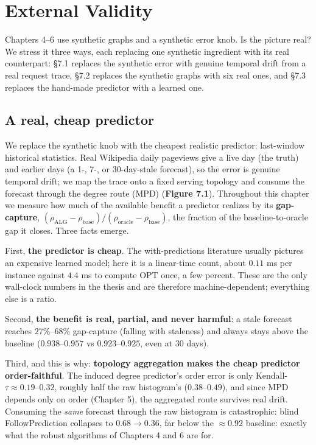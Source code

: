\chapter{External Validity}

Chapters 4--6 use synthetic graphs and a synthetic error knob. Is the
picture real? We stress it three ways, each replacing one synthetic
ingredient with its real counterpart: §7.1 replaces the synthetic error
with genuine temporal drift from a real request trace, §7.2 replaces the
synthetic graphs with six real ones, and §7.3 replaces the hand-made
predictor with a learned one.

\section{A real, cheap predictor}

We replace the synthetic knob with the cheapest realistic predictor:
last-window historical statistics. Real Wikipedia daily pageviews give a
live day (the truth) and earlier days (a 1-, 7-, or 30-day-stale
forecast), so the error is genuine temporal drift; we map the trace onto
a fixed serving topology and consume the forecast through the degree
route (MPD) (\textbf{Figure 7.1}). Throughout this chapter we measure
how much of the available benefit a predictor realizes by its
\textbf{gap-capture},
\((\rho_{\mathrm{ALG}}-\rho_{\mathrm{base}})/(\rho_{\mathrm{oracle}}-\rho_{\mathrm{base}})\),
the fraction of the baseline-to-oracle gap it closes. Three facts
emerge.

First, \textbf{the predictor is cheap}. The with-predictions literature
usually pictures an expensive learned model; here it is a linear-time
count, about \(0.11\) ms per instance against \(4.4\) ms to compute
\(\mathrm{OPT}\) once, a few percent. These are the only wall-clock
numbers in the thesis and are therefore machine-dependent; everything
else is a ratio.

Second, \textbf{the benefit is real, partial, and never harmful}: a
stale forecast reaches \(27\%\)--\(68\%\) gap-capture (falling with
staleness) and always stays above the baseline (\(0.938\)--\(0.957\) vs
\(0.923\)--\(0.925\), even at 30 days).

Third, and this is why: \textbf{topology aggregation makes the cheap
predictor order-faithful}. The induced degree predictor's order error is
only Kendall-\(\tau\approx0.19\)--\(0.32\), roughly half the raw
histogram's (\(0.38\)--\(0.49\)), and since MPD depends only on order
(Chapter 5), the aggregated route survives real drift. Consuming the
\emph{same} forecast through the raw histogram is catastrophic: blind
FollowPrediction collapses to \(0.68\to0.36\), far below the
\(\approx0.92\) baseline: exactly what the robust algorithms of Chapters
4 and 6 are for.

